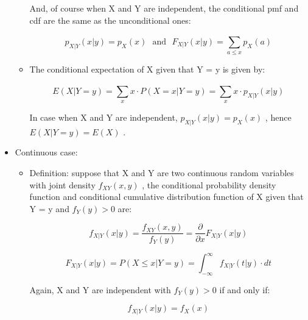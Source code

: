 \documentclass[12pt]{report}
\renewcommand{\_}{\kern-1.5pt\textunderscore\kern-1.5pt}
\begin{document}
\begin{itemize}
\begin{itemize}
And, of course when X and Y are independent, the conditional pmf and cdf are the same as the unconditional ones:\par

 \[ p_{X \vert Y} \left( x \vert y \right) = p_{X} \left( x \right) ~~~\mathrm{and~~~}F_{X \vert Y} \left( x \vert y \right) = \sum _{a \leq x}^{}p_{X} \left( a \right)  \] \par

	\item The conditional expectation of X given that Y = y is given by:\par

 \[ E \left( X \vert Y=y \right) = \sum _{x}^{}x \cdot P \left( X=x \vert Y=y \right) = \sum _{x}^{}x \cdot p_{X \vert Y} \left( x \vert y \right)  \] \par

In case when X and Y are independent,  \( p_{X \vert Y} \left( x \vert y \right) = p_{X} \left( x \right)  \) , hence  \( E \left( X \vert Y=y \right) =E \left( X \right)  \) .\par


\end{itemize}
	\item Continuous case: \par

\begin{itemize}
	\item Definition: suppose that X and Y are two continuous random variables with joint density  \( f_{XY} \left( x,y \right)  \) , the conditional probability density function and conditional cumulative distribution function of X given that Y = y and  \( f_{Y} \left( y \right) >0 \)  are:\par

 \[ f_{X \vert Y} \left( x \vert y \right) =\frac{f_{XY} \left( x,y \right) }{f_{Y} \left( y \right) }=\frac{ \partial }{ \partial x}F_{X \vert Y} \left( x \vert y \right)  \] \par

 \[ F_{X \vert Y} \left( x \vert y \right) =P \left( X \leq x \vert Y=y \right) = \int _{-\infty}^{\infty}f_{X \vert Y} \left( t \vert y \right)  \cdot dt \] \par

Again, X and Y are independent with  \( f_{Y} \left( y \right) >0 \)  if and only if:\par

 \[ f_{X \vert Y} \left( x \vert y \right) =f_{X} \left( x \right)  \] \par


\end{itemize}
\end{itemize}
\end{document}
